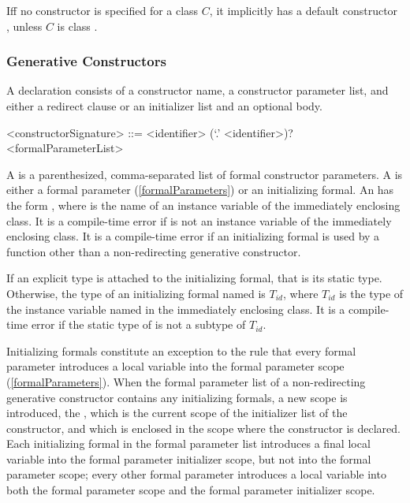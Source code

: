 \documentclass[makeidx]{article}
\begin{document}

\LMHash{}%
If{}f no constructor is specified for a class $C$, it implicitly has a default constructor , unless $C$ is class .


\subsubsection{Generative Constructors}

\LMHash{}%
A 
declaration consists of a constructor name, a constructor parameter list,
and either a redirect clause or an initializer list and an optional body.

\begin{grammar}
<constructorSignature> ::= \gnewline{}
  <identifier> (`.' <identifier>)? <formalParameterList>
\end{grammar}

\LMHash{}%
A  is a parenthesized, comma-separated list of formal constructor parameters.
A  is either a formal parameter (\ref{formalParameters}) or an initializing formal.
An  has the form , where \id{} is the name of an instance variable of the immediately enclosing class.
It is a compile-time error if \id{} is not an instance variable of the immediately enclosing class.
It is a compile-time error if an initializing formal is used by a function other than a non-redirecting generative constructor.

\LMHash{}%
If an explicit type is attached to the initializing formal, that is its static type.
Otherwise, the type of an initializing formal named \id{} is $T_{id}$, where $T_{id}$ is the type of the instance variable named \id{} in the immediately enclosing class.
It is a compile-time error if the static type of \id{} is not a subtype of $T_{id}$.

\LMHash{}%
Initializing formals constitute an exception to the rule that
every formal parameter introduces a local variable into
the formal parameter scope (\ref{formalParameters}).
When the formal parameter list of a non-redirecting generative constructor
contains any initializing formals, a new scope is introduced, the
,
which is the current scope of the initializer list of the constructor,
and which is enclosed in the scope where the constructor is declared.
Each initializing formal in the formal parameter list introduces a final local variable into the formal parameter initializer scope, but not into the formal parameter scope; every other formal parameter introduces a local variable into both the formal parameter scope and the formal parameter initializer scope.
\end{document}
